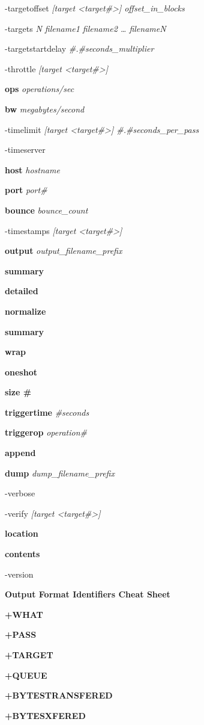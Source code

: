 -targetoffset \emph{{[}target \textless target\#\textgreater{]} offset\_in\_blocks}

-targets \emph{N filename1 filename2 \ldots{} filenameN}

-targetstartdelay \emph{\#.\#seconds\_multiplier}

-throttle \emph{{[}target \textless target\#\textgreater{]}}

\textbf{ops} \emph{operations/sec}

\textbf{bw} \emph{megabytes/second}

-timelimit \emph{{[}target \textless target\#\textgreater{]} \#.\#seconds\_per\_pass}

-timeserver

\textbf{host} \emph{hostname}

\textbf{port} \emph{port\#}

\textbf{bounce} \emph{bounce\_count}

-timestamps \emph{{[}target \textless target\#\textgreater{]}}

\textbf{output} \emph{output\_filename\_prefix}

\textbf{summary}

\textbf{detailed}

\textbf{normalize}

\textbf{summary}

\textbf{wrap}

\textbf{oneshot}

\textbf{size \#}

\textbf{triggertime} \emph{\#seconds}

\textbf{triggerop} \emph{operation\#}

\textbf{append}

\textbf{dump} \emph{dump\_filename\_prefix}

-verbose

-verify \emph{{[}target \textless target\#\textgreater{]}}

\textbf{location}

\textbf{contents}

-version

\textbf{Output Format Identifiers Cheat Sheet}

\textbf{+WHAT}

\textbf{+PASS}

\textbf{+TARGET}

\textbf{+QUEUE}

\textbf{+BYTESTRANSFERED}

\textbf{+BYTESXFERED}

